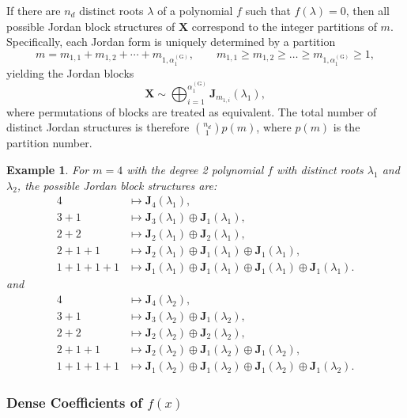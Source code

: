 \documentclass[11pt]{article}
\newtheorem{example}{Example}
\begin{document}

If there are $n_d$ distinct roots $\lambda$ of a polynomial $f$ such that $f(\lambda)=0$, then all possible Jordan block structures of $\bm X$ correspond to the integer partitions of $m$. Specifically, each Jordan form is uniquely determined by a partition
\[
m = m_{1,1} + m_{1,2} + \cdots + m_{1,\alpha_1^{(\mathrm{G})}}, \qquad m_{1,1} \ge m_{1,2} \ge \dots \ge m_{1,\alpha_1^{(\mathrm{G})}} \ge 1,
\]
yielding the Jordan blocks
\[
\bm{X} \sim \bigoplus_{i=1}^{\alpha_1^{(\mathrm{G})}} \bm{J}_{m_{1,i}}(\lambda_1),
\]
where permutations of blocks are treated as equivalent. The total number of distinct Jordan structures is therefore ${n_d \choose 1}p(m)$, where $p(m)$ is the partition number. 

\begin{example}
%
For $m=4$ with the degree 2 polynomial $f$ with distinct roots $\lambda_1$ and $\lambda_2$, the possible Jordan block structures are:
\[
\begin{aligned}
4 &\mapsto \bm J_4(\lambda_1), \\
3+1 &\mapsto \bm J_3(\lambda_1) \oplus \bm J_1(\lambda_1), \\
2+2 &\mapsto \bm J_2(\lambda_1) \oplus \bm J_2(\lambda_1), \\
2+1+1 &\mapsto \bm J_2(\lambda_1) \oplus \bm J_1(\lambda_1) \oplus \bm J_1(\lambda_1), \\
1+1+1+1 &\mapsto \bm J_1(\lambda_1)\oplus\bm J_1(\lambda_1)\oplus\bm J_1(\lambda_1)\oplus\bm J_1(\lambda_1).
\end{aligned}
\]
and
\[
\begin{aligned}
4 &\mapsto \bm J_4(\lambda_2), \\
3+1 &\mapsto \bm J_3(\lambda_2) \oplus \bm J_1(\lambda_2), \\
2+2 &\mapsto \bm J_2(\lambda_2) \oplus \bm J_2(\lambda_2), \\
2+1+1 &\mapsto \bm J_2(\lambda_2) \oplus \bm J_1(\lambda_2) \oplus \bm J_1(\lambda_2), \\
1+1+1+1 &\mapsto \bm J_1(\lambda_2)\oplus\bm J_1(\lambda_2)\oplus\bm J_1(\lambda_2)\oplus\bm J_1(\lambda_2).
\end{aligned}
\]
\end{example}



\subsubsection{Dense Coefficients of $f(x)$}\label{sec':D_One Distinct Eigenvalue_N}
\end{document}
